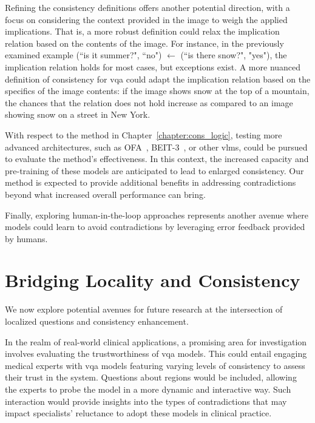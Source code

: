Refining the consistency definitions offers another potential direction, with a focus on considering the context provided in the image to weigh the applied implications. That is, a  more robust definition could relax the implication relation based on the contents of the image. For instance, in the previously examined example (``is it summer?", ``no") $\leftarrow$ (``is there snow?", "yes"), the implication relation holds for most cases, but exceptions exist. A more nuanced definition of consistency for \gls{vqa} could adapt the implication relation based on the specifics of the image contents: if the image shows snow at the top of a mountain, the chances that the relation does not hold increase as compared to an image showing snow on a street in New York. 

With respect to the method in Chapter~\ref{chapter:cons_logic}, testing more advanced architectures, such as OFA~\cite{wang2022ofa}, BEIT-3~\cite{wang2022image}, or other \glspl{vlm}, could be pursued to evaluate the method's effectiveness. In this context, the increased capacity and pre-training of these models are anticipated to lead to enlarged consistency. Our method is expected to provide additional benefits in addressing contradictions beyond what increased overall performance can bring. 

Finally, exploring human-in-the-loop approaches represents another avenue where models could learn to avoid contradictions by leveraging error feedback provided by humans.


\section{Bridging Locality and Consistency}

We now explore potential avenues for future research at the intersection of localized questions and consistency enhancement. 

In the realm of real-world clinical applications, a promising area for investigation involves evaluating the trustworthiness of \gls{vqa} models. This could entail engaging medical experts with \gls{vqa} models featuring varying levels of consistency to assess their trust in the system. Questions about regions would be included, allowing the experts to probe the model in a more dynamic and interactive way. Such interaction would provide insights into the types of contradictions that may impact specialists' reluctance to adopt these models in clinical practice.

